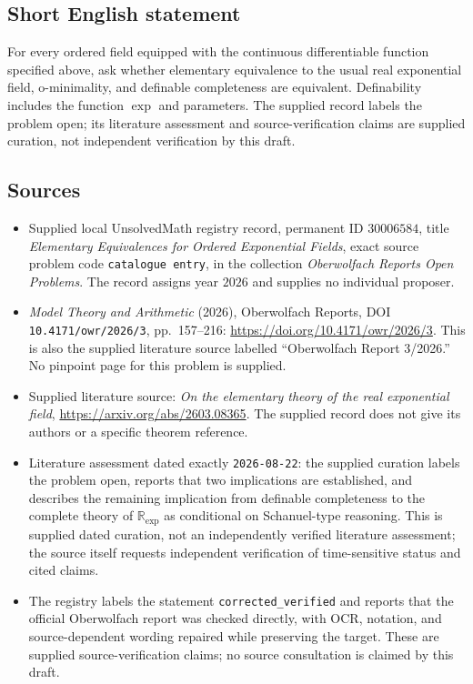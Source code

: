 \documentclass[11pt]{article}
\begin{document}
\subsection{Short English statement}
For every ordered field equipped with the continuous differentiable function specified above, ask whether elementary equivalence to the usual real exponential field, o-minimality, and definable completeness are equivalent. Definability includes the function \(\exp\) and parameters. The supplied record labels the problem open; its literature assessment and source-verification claims are supplied curation, not independent verification by this draft.
\subsection{Sources}
\begin{itemize}
\item Supplied local UnsolvedMath registry record, permanent ID \(30006584\), title \emph{Elementary Equivalences for Ordered Exponential Fields}, exact source problem code \texttt{catalogue entry}, in the collection \emph{Oberwolfach Reports Open Problems}. The record assigns year \(2026\) and supplies no individual proposer.
\item \emph{Model Theory and Arithmetic} (2026), Oberwolfach Reports, DOI \texttt{10.4171/owr/2026/3}, pp.\ 157--216: \url{https://doi.org/10.4171/owr/2026/3}. This is also the supplied literature source labelled ``Oberwolfach Report 3/2026.'' No pinpoint page for this problem is supplied.
\item Supplied literature source: \emph{On the elementary theory of the real exponential field}, \url{https://arxiv.org/abs/2603.08365}. The supplied record does not give its authors or a specific theorem reference.
\item Literature assessment dated exactly \texttt{2026-08-22}: the supplied curation labels the problem open, reports that two implications are established, and describes the remaining implication from definable completeness to the complete theory of \(\mathbb R_{\exp}\) as conditional on Schanuel-type reasoning. This is supplied dated curation, not an independently verified literature assessment; the source itself requests independent verification of time-sensitive status and cited claims.
\item The registry labels the statement \texttt{corrected\_verified} and reports that the official Oberwolfach report was checked directly, with OCR, notation, and source-dependent wording repaired while preserving the target. These are supplied source-verification claims; no source consultation is claimed by this draft.
\end{itemize}
\end{document}
